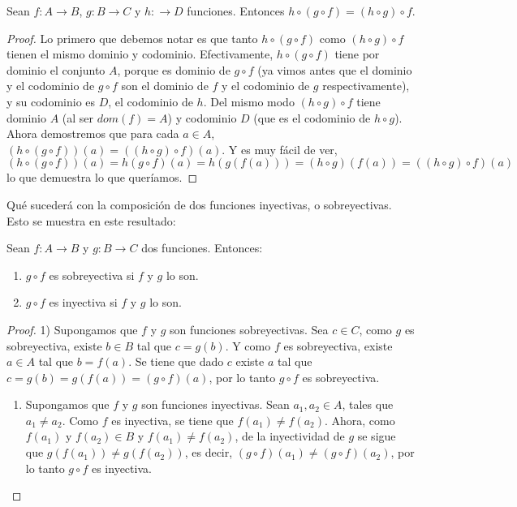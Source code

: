 \documentclass[12pt,]{krantz}
\providecommand{\tightlist}{%
  \setlength{\itemsep}{0pt}\setlength{\parskip}{0pt}}
\theoremstyle{definition}
\theoremstyle{definition}
\theoremstyle{definition}
\theoremstyle{remark}
\let\BeginKnitrBlock\begin \let\EndKnitrBlock\end
\begin{document}
\BeginKnitrBlock{lemma}
\protect\hypertarget{lem:unnamed-chunk-37}{}{\label{lem:unnamed-chunk-37}
}Sean \(f:A\longrightarrow B\), \(g:B\longrightarrow C\) y
\(h:\longrightarrow D\) funciones. Entonces
\(h\circ (g\circ f)=(h\circ g)\circ f\).
\EndKnitrBlock{lemma}

\BeginKnitrBlock{proof}
{}Lo primero que debemos notar es que
tanto \(h\circ (g\circ f)\) como \((h\circ g)\circ f\) tienen el mismo
dominio y codominio. Efectivamente, \(h\circ (g\circ f)\) tiene por
dominio el conjunto \(A\), porque es dominio de \(g\circ f\) (ya vimos
antes que el dominio y el codominio de \(g\circ f\) son el dominio de
\(f\) y el codominio de \(g\) respectivamente), y su codominio es \(D\),
el codominio de \(h\). Del mismo modo \((h\circ g)\circ f\) tiene
dominio \(A\) (al ser \(dom(f)=A\)) y codominio \(D\) (que es el
codominio de \(h\circ g\)). Ahora demostremos que para cada \(a\in A\),
\((h\circ (g\circ f))(a)=((h\circ g)\circ f)(a)\). Y es muy fácil de
ver,
\[(h\circ (g\circ f))(a)=h(g\circ f)(a)=h(g(f(a)))=(h\circ g)(f(a))=((h\circ g)\circ f)(a)\]
lo que demuestra lo que queríamos.
\EndKnitrBlock{proof}

Qué sucederá con la composición de dos funciones inyectivas, o
sobreyectivas. Esto se muestra en este resultado:

\BeginKnitrBlock{lemma}
\protect\hypertarget{lem:lema1-2}{}{\label{lem:lema1-2} }Sean
\(f:A\longrightarrow B\) y \(g:B\longrightarrow C\) dos funciones.
Entonces:

\begin{enumerate}
\def\labelenumi{\arabic{enumi})}
\item
  \(g\circ f\) es sobreyectiva si \(f\) y \(g\) lo son.
\item
  \(g\circ f\) es inyectiva si \(f\) y \(g\) lo son.
\end{enumerate}
\EndKnitrBlock{lemma}

\BeginKnitrBlock{proof}
{} 1) Supongamos que \(f\) y \(g\) son
funciones sobreyectivas. Sea \(c\in C\), como \(g\) es sobreyectiva,
existe \(b\in B\) tal que \(c=g(b)\). Y como \(f\) es sobreyectiva,
existe \(a\in A\) tal que \(b=f(a)\). Se tiene que dado \(c\) existe
\(a\) tal que \(c=g(b)=g(f(a))=(g\circ f)(a)\), por lo tanto
\(g\circ f\) es sobreyectiva.

\begin{enumerate}
\def\labelenumi{\arabic{enumi})}
\setcounter{enumi}{1}
\tightlist
\item
  Supongamos que \(f\) y \(g\) son funciones inyectivas. Sean
  \(a_{1}, a_{2}\in A\), tales que \(a_{1}\neq a_{2}\). Como \(f\) es
  inyectiva, se tiene que \(f(a_{1})\neq f(a_{2})\). Ahora, como
  \(f(a_{1}) \mbox{ y }f(a_{2})\in B\) y \(f(a_{1})\neq f(a_{2})\), de
  la inyectividad de \(g\) se sigue que \(g(f(a_{1}))\neq g(f(a_{2}))\),
  es decir, \((g\circ f)(a_{1})\neq (g\circ f)(a_{2})\), por lo tanto
  \(g\circ f\) es inyectiva.
\end{enumerate}
\EndKnitrBlock{proof}
\end{document}

